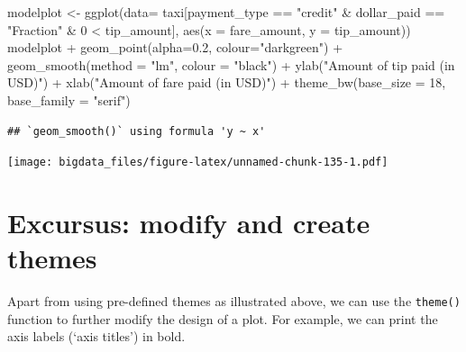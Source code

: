 \documentclass[
  12pt,
]{style/krantz}
\newenvironment{Shaded}{\begin{snugshade}}{\end{snugshade}}
\newcommand{\AttributeTok}[1]{\textcolor[rgb]{0.77,0.63,0.00}{#1}}
\newcommand{\DecValTok}[1]{\textcolor[rgb]{0.00,0.00,0.81}{#1}}
\newcommand{\FloatTok}[1]{\textcolor[rgb]{0.00,0.00,0.81}{#1}}
\newcommand{\FunctionTok}[1]{\textcolor[rgb]{0.00,0.00,0.00}{#1}}
\newcommand{\NormalTok}[1]{#1}
\newcommand{\OtherTok}[1]{\textcolor[rgb]{0.56,0.35,0.01}{#1}}
\newcommand{\SpecialCharTok}[1]{\textcolor[rgb]{0.00,0.00,0.00}{#1}}
\newcommand{\StringTok}[1]{\textcolor[rgb]{0.31,0.60,0.02}{#1}}
\begin{document}
\begin{Shaded}
\begin{Highlighting}[]
\NormalTok{modelplot }\OtherTok{\textless{}{-}} \FunctionTok{ggplot}\NormalTok{(}\AttributeTok{data=}\NormalTok{ taxi[payment\_type }\SpecialCharTok{==} \StringTok{"credit"} \SpecialCharTok{\&}\NormalTok{ dollar\_paid }\SpecialCharTok{==} \StringTok{"Fraction"} \SpecialCharTok{\&} \DecValTok{0} \SpecialCharTok{\textless{}}\NormalTok{ tip\_amount],}
                    \FunctionTok{aes}\NormalTok{(}\AttributeTok{x =}\NormalTok{ fare\_amount, }\AttributeTok{y =}\NormalTok{ tip\_amount))}
\NormalTok{modelplot }\SpecialCharTok{+}
     \FunctionTok{geom\_point}\NormalTok{(}\AttributeTok{alpha=}\FloatTok{0.2}\NormalTok{, }\AttributeTok{colour=}\StringTok{"darkgreen"}\NormalTok{) }\SpecialCharTok{+}
     \FunctionTok{geom\_smooth}\NormalTok{(}\AttributeTok{method =} \StringTok{"lm"}\NormalTok{, }\AttributeTok{colour =} \StringTok{"black"}\NormalTok{) }\SpecialCharTok{+}
     \FunctionTok{ylab}\NormalTok{(}\StringTok{"Amount of tip paid (in USD)"}\NormalTok{) }\SpecialCharTok{+}
     \FunctionTok{xlab}\NormalTok{(}\StringTok{"Amount of fare paid (in USD)"}\NormalTok{) }\SpecialCharTok{+}
     \FunctionTok{theme\_bw}\NormalTok{(}\AttributeTok{base\_size =} \DecValTok{18}\NormalTok{, }\AttributeTok{base\_family =} \StringTok{"serif"}\NormalTok{)}
\end{Highlighting}
\end{Shaded}

\begin{verbatim}
## `geom_smooth()` using formula 'y ~ x'
\end{verbatim}

\texttt{[image: bigdata\_files/figure-latex/unnamed-chunk-135-1.pdf]}

\hypertarget{excursus-modify-and-create-themes}{%
\section{Excursus: modify and create themes}\label{excursus-modify-and-create-themes}}

Apart from using pre-defined themes as illustrated above, we can use the \texttt{theme()} function to further modify the design of a plot. For example, we can print the axis labels (`axis titles') in bold.
\end{document}

